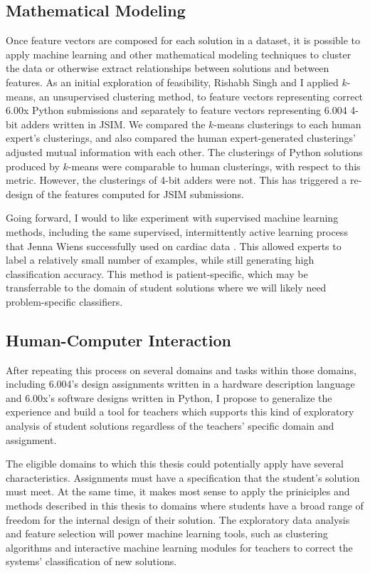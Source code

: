 \documentclass[12pt]{article}
\begin{document}
\subsection{Mathematical Modeling}

Once feature vectors are composed for each solution in a dataset, it is possible to apply machine learning and other mathematical modeling techniques to cluster the data or otherwise extract relationships between solutions and between features. As an initial exploration of feasibility, Rishabh Singh and I applied $k$-means, an unsupervised clustering method, to feature vectors representing correct 6.00x Python submissions and separately to feature vectors representing 6.004 4-bit adders written in JSIM. We compared the $k$-means clusterings to each human expert's clusterings, and also compared the human expert-generated clusterings' adjusted mutual information with each other. The clusterings of Python solutions produced by $k$-means were comparable to human clusterings, with respect to this metric. However, the clusterings of 4-bit adders were not. This has triggered a re-design of the features computed for JSIM submissions.

Going forward, I would to like experiment with supervised machine learning methods, including the same supervised, intermittently active learning process that Jenna Wiens successfully used on cardiac data \cite{JWiensNIPS}. This allowed experts to label a relatively small number of examples, while still generating high classification accuracy. This method is patient-specific, which may be transferrable to the domain of student solutions where we will likely need problem-specific classifiers.

\subsection{Human-Computer Interaction}

After repeating this process on several domains and tasks within those domains, including 6.004's design assignments written in a hardware description language and 6.00x's software designs written in Python, I propose to generalize the experience and build a tool for teachers which supports this kind of exploratory analysis of student solutions regardless of the teachers' specific domain and assignment. 

The eligible domains to which this thesis could potentially apply have several characteristics. Assignments must have a specification that the student's solution must meet. At the same time, it makes most sense to apply the priniciples and methods described in this thesis to domains where students have a broad range of freedom for the internal design of their solution. The exploratory data analysis and feature selection will power machine learning tools, such as clustering algorithms and interactive machine learning modules for teachers to correct the systems' classification of new solutions. 
\end{document}
